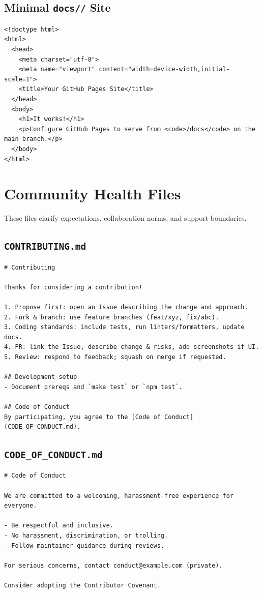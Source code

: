 \documentclass[11pt]{article}
\newcommand{\file}[1]{\texttt{#1}}
\newcommand{\dir}[1]{\texttt{#1/}}
\begin{document}
\subsection{Minimal \dir{docs/} Site}
\begin{verbatim}
<!doctype html>
<html>
  <head>
    <meta charset="utf-8">
    <meta name="viewport" content="width=device-width,initial-scale=1">
    <title>Your GitHub Pages Site</title>
  </head>
  <body>
    <h1>It works!</h1>
    <p>Configure GitHub Pages to serve from <code>/docs</code> on the main branch.</p>
  </body>
</html>
\end{verbatim}
\clearpage

\section{Community Health Files}
These files clarify expectations, collaboration norms, and support boundaries.

\subsection{\file{CONTRIBUTING.md}}
\begin{verbatim}
# Contributing

Thanks for considering a contribution!

1. Propose first: open an Issue describing the change and approach.
2. Fork & branch: use feature branches (feat/xyz, fix/abc).
3. Coding standards: include tests, run linters/formatters, update docs.
4. PR: link the Issue, describe change & risks, add screenshots if UI.
5. Review: respond to feedback; squash on merge if requested.

## Development setup
- Document prereqs and `make test` or `npm test`.

## Code of Conduct
By participating, you agree to the [Code of Conduct](CODE_OF_CONDUCT.md).
\end{verbatim}

\subsection{\file{CODE\_OF\_CONDUCT.md}}
\begin{verbatim}
# Code of Conduct

We are committed to a welcoming, harassment-free experience for everyone.

- Be respectful and inclusive.
- No harassment, discrimination, or trolling.
- Follow maintainer guidance during reviews.

For serious concerns, contact conduct@example.com (private).

Consider adopting the Contributor Covenant.
\end{verbatim}
\end{document}
